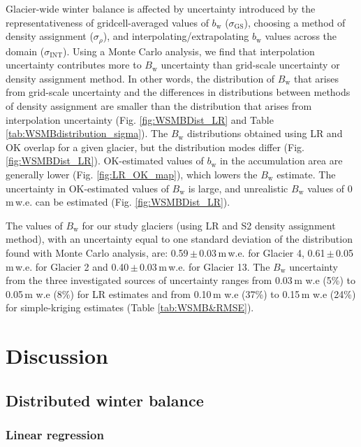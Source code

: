 \documentclass[twocolumn, letterpaper]{igs}
\begin{document}
Glacier-wide winter balance is affected by uncertainty introduced by the representativeness of gridcell-averaged values of $b_\mathrm{w}$ ($\sigma_{\mathrm{GS}}$), choosing a method of density assignment ($\sigma_{\rho}$), and interpolating/extrapolating $b_\mathrm{w}$ values across the domain ($\sigma_{\mathrm{INT}}$). Using a Monte Carlo analysis, we find that interpolation uncertainty contributes more to $B_\mathrm{w}$ uncertainty than grid-scale uncertainty or density assignment method. In other words, the distribution of $B_\mathrm{w}$ that arises from grid-scale uncertainty and the differences in distributions between methods of density assignment are smaller than the distribution that arises from interpolation uncertainty (Fig. \ref{fig:WSMBDist_LR} and Table \ref{tab:WSMBdistribution_sigma}). The $B_\mathrm{w}$ distributions obtained using LR and OK overlap for a given glacier, but the distribution modes differ (Fig. \ref{fig:WSMBDist_LR}). OK-estimated values of $b_\mathrm{w}$ in the accumulation area are generally lower (Fig. \ref{fig:LR_OK_map}), which lowers the $B_\mathrm{w}$ estimate. The uncertainty in OK-estimated values of $B_\mathrm{w}$ is large, and unrealistic $B_\mathrm{w}$ values of 0\,m\,w.e. can be estimated (Fig. \ref{fig:WSMBDist_LR}).

The values of $B_\mathrm{w}$ for our study glaciers (using LR and S2 density assignment method), with an uncertainty equal to one standard deviation of the distribution found with Monte Carlo analysis, are: 0.59\,$\pm$\,0.03\,m\,w.e. for Glacier 4, 0.61\,$\pm$\,0.05\,m\,w.e. for Glacier 2 and 0.40\,$\pm$\,0.03\,m\,w.e. for Glacier 13. The $B_\mathrm{w}$ uncertainty from the three investigated sources of uncertainty ranges from 0.03\,m w.e (5\%) to 0.05\,m w.e (8\%) for LR estimates and from 0.10\,m w.e (37\%) to 0.15\,m w.e (24\%) for simple-kriging estimates (Table \ref{tab:WSMB&RMSE}).

\section{Discussion}

\subsection{Distributed winter balance}

\subsubsection{Linear regression}
\end{document}
